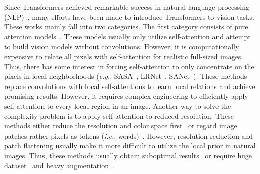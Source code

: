 \documentclass[10pt,twocolumn,letterpaper]{article}
\begin{document}
Since Transformers achieved remarkable success in natural language processing (NLP)~\cite{vaswani2017attention,devlin2018bert,radford2018improving}, many efforts have been made to introduce Transformers to vision tasks. These works mainly fall into two categories. The first category consists of pure attention models~\cite{ramachandran2019stand,hu2019local, zhao2020exploring, chen2020generative, dosovitskiy2020image, touvron2020training, wang2021pyramid}. These models usually only utilize self-attention and attempt to build vision models without convolutions. However, it is computationally expensive to relate all pixels with self-attention for realistic full-sized images. Thus, there has some interest in forcing self-attention to only concentrate on the pixels in local neighborhoods (\textit{e.g.}, SASA~\cite{ramachandran2019stand}, LRNet~\cite{hu2019local}, SANet~\cite{zhao2020exploring}). These methods replace convolutions with local self-attentions to learn local relations and achieve promising results. However, it requires complex engineering to efficiently apply self-attention to every local region in an image. Another way to solve the complexity problem is to apply self-attention to reduced resolution. These methods either reduce the resolution and color space first~\cite{chen2020generative} or regard image patches rather pixels as tokens (\textit{i.e.}, words)~\cite{dosovitskiy2020image, touvron2020training}. However, resolution reduction and patch flattening usually make it more difficult to utilize the local prior in natural images. Thus, these methods usually obtain suboptimal results~\cite{chen2020generative} or require huge dataset~\cite{dosovitskiy2020image} and heavy augmentation~\cite{touvron2020training}.  
\end{document}
